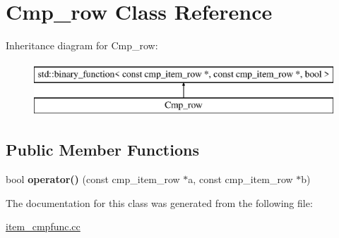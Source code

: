 \hypertarget{classCmp__row}{}\section{Cmp\+\_\+row Class Reference}
\label{classCmp__row}
Inheritance diagram for Cmp\+\_\+row\+:\begin{figure}[H]
\begin{center}
\leavevmode
\includegraphics[height=2.000000cm]{classCmp__row}
\end{center}
\end{figure}
\subsection*{Public Member Functions}
\begin{DoxyCompactItemize}
\item 
\mbox{\label{classCmp__row_a3769e57ca5cf189d015da3d9c471f712}} 
bool {\bfseries operator()} (const cmp\+\_\+item\+\_\+row $\ast$a, const cmp\+\_\+item\+\_\+row $\ast$b)
\end{DoxyCompactItemize}


The documentation for this class was generated from the following file\+:\begin{DoxyCompactItemize}
\item 
\mbox{\hyperlink{item__cmpfunc_8cc}{item\+\_\+cmpfunc.\+cc}}\end{DoxyCompactItemize}
